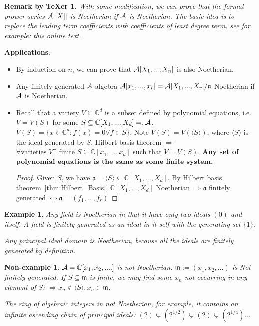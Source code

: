 \documentclass[11pt]{article}
\newtheorem{rmkt}[thm]{Remark by TeXer}
\newtheorem{ex}[thm]{Example}
\newtheorem{nex}[thm]{Non-example}
\newcommand{\cplx}{\mathbb C}
\newcommand{\sca}{{\mathfrak a}}
\newcommand{\scm}{{\mathfrak m}}
\newcommand{\cala}{{\cal A}}
\newcommand{\Lrta}{\Longrightarrow}
\newcommand{\Llrta}{\Longleftrightarrow}
\newcommand{\lgl}{\langle}
\newcommand{\rgl}{\rangle}
\begin{document}
\begin{rmkt}
With some modification, we can prove that the formal prower series $\cala[[X]]$ is Noetherian if $\cala$ is Noetherian. The basic idea is to replace the leading term coefficients with coefficients of least degree term, see for example: \href{https://faculty.math.illinois.edu/~r-ash/Algebra/Chapter8.pdf}{this online text}.
\end{rmkt}

\textbf{Applications}:
\begin{itemize}
    \item By induction on $n$, we can prove that $\cala[X_1,...,X_n]$ is also Noetherian.
    \item 
    Any finitely generated $\cala$-algebra $\cala[x_1,...,x_r]=\cala[X_1,...,X_r]/\sca$ Noetherian if $\cala $ is Noetherian. 
    \item 
    Recall that  a variety $V\subseteq \cplx^d$ is a subset defined by polynomial equations, i.e.
    $V=V(S)$ for some $S\subseteq \cplx[X_1,...,X_d]=:\cala$. $V(S)=\{x\in \cplx^d:f(x)=0\forall f\in S\}$.
    Note $V(S)=V(\lgl S\rgl)$, where $\lgl S\rgl$ is the ideal generated by $S$. Hilbert basis theorem $\Lrta$ $\forall \text{varieties } V\exists \text{ finite } S\subseteq \cplx[x_1,...,x_d]$ such that $V=V(S)$. \textbf{Any set of polynomial equations is the same as some finite system.}
    \begin{proof}
    Given $S$, we have $\sca=\lgl S\rgl\subseteq\cplx[X_1,...,X_d]$. By Hilbert basis theorem~\ref{thm:Hilbert_Basis}, $\cplx[X_1,...,X_d] $ Noetherian $\Lrta\sca$ finitely generated $\Llrta\sca=(f_1,...,f_r)$
    \end{proof}
\end{itemize}
\begin{ex}
Any field is Noetherian in that it have only two ideals $(0) $ and itself. A field  is finitely generated as an ideal in it self with the generating set $\{1\}$.

Any principal ideal domain is Noetherian, because all the ideals are finitely generated by definition.
\end{ex}
\begin{nex}
$\cala=\cplx[x_1,x_2,....]$ is not Noetherian: $\scm:=(x_1,x_2,...)$ is Not finitely generated. If $S\subseteq \scm$ is finite, we may find some $x_n$ not occurring in any element of $S$: $\Lrta x_n\notin \lgl S\rgl, x_n\in \scm$.

The ring of algebraic integers in not Noetherian, for example, it contains an infinite ascending chain of principal ideals: $(2)\subsetneq (2^{1/2})\subsetneq (2)\subsetneq (2^{1/4})...$
\end{nex}
\end{document}
